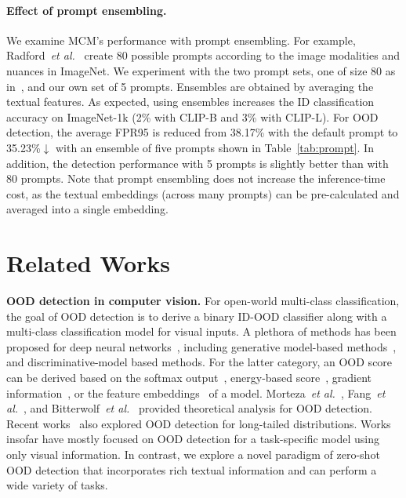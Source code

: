 \documentclass{article}
\begin{document}
\paragraph{Effect of prompt ensembling.}
We examine MCM's performance with prompt ensembling. For example, Radford~\emph{et al.}~\cite{radford2021learning} create 80 possible prompts according to the image modalities and nuances in ImageNet. We experiment with the two prompt sets, one of size 80 as in~\cite{radford2021learning}, and our own set of 5 prompts. Ensembles are obtained by averaging the textual features. As expected, using ensembles increases the ID classification accuracy on ImageNet-1k (2\% with CLIP-B and 3\% with CLIP-L). 
For OOD detection, the average FPR95 is reduced from 38.17\% with the default prompt to 35.23\%{$\downarrow$} with an ensemble of five prompts shown in Table~\ref{tab:prompt}. In addition, the detection performance with 5 prompts is slightly better than with 80 prompts. Note that prompt ensembling does not increase the inference-time cost, as the textual embeddings (across many prompts) can be pre-calculated and averaged into a single embedding.

\section{Related Works}
\label{sec:related_works}
\noindent\textbf{OOD detection in computer vision.} For open-world multi-class classification, the goal of OOD detection is to derive a binary ID-OOD classifier along with a multi-class classification model for visual inputs. A plethora of methods has been proposed for deep neural networks~\cite{yang2021generalized}, including generative model-based methods~\cite{cai2023frequency,ge2017generative,kirichenko2020normalizing,nalisnick2019deep,neal2018open,oza2019c2ae,ren2019likelihood,serra2019input,xiao2020likelihood}, and discriminative-model based methods. For the latter category, an OOD score can be derived based on the softmax output~\cite{openmax16cvpr,2018onemore,hein2019why,hendrycks2016baseline,hsu2020generalized,huang2021mos,liang2018enhancing,yang2021scood}, energy-based score~\cite{du2022vos,liu2020energy,ming2022posterior,sun2021tone,sun2022dice,wang2021canmulti}, gradient information~\cite{huang2021importance}, or the feature embeddings~\cite{du2022siren,lee2018simple,2020gram,2021ssd,sun2022knn,tack2020csi,winkens2020contrastive} of a model. Morteza~\emph{et al.}~\cite{morteza2022provable}, Fang~\emph{et al.}~\cite{fang2022learnable}, and Bitterwolf~\emph{et al.}~\cite{bitterwolf2022breaking} provided theoretical analysis for OOD detection. Recent works~\cite{roy2022does,wang2022partial} also explored OOD detection for long-tailed distributions. Works insofar have mostly focused on OOD detection for a task-specific model using only visual information. In contrast, we explore a novel paradigm of zero-shot OOD detection that incorporates rich textual information and can perform a wide variety of tasks. 
\end{document}
